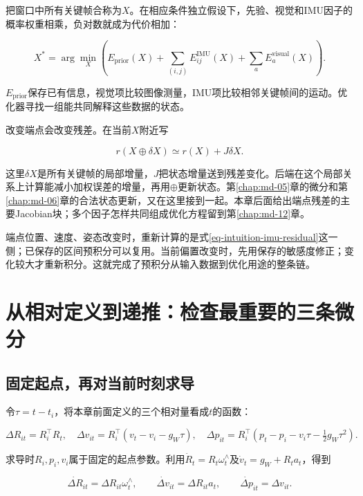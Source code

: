 把窗口中所有关键帧合称为$X$。在相应条件独立假设下，先验、视觉和IMU因子的概率权重相乘，负对数就成为代价相加：

\begin{equation*}
X^*=\arg\min_X\left(E_{\mathrm{prior}}(X)
       +\sum_{(i,j)}E_{ij}^{\mathrm{IMU}}(X)
       +\sum_a E_a^{\mathrm{visual}}(X)\right).
\end{equation*}

$E_{\mathrm{prior}}$保存已有信息，视觉项比较图像测量，IMU项比较相邻关键帧间的运动。优化器寻找一组能共同解释这些数据的状态。

改变端点会改变残差。在当前$X$附近写

\begin{equation*}
r(X\oplus\delta X)\simeq r(X)+J\delta X.
\end{equation*}

这里$\delta X$是所有关键帧的局部增量，$J$把状态增量送到残差变化。后端在这个局部关系上计算能减小加权误差的增量，再用$\oplus$更新状态。第\ref{chap:md-05}章的微分和第\ref{chap:md-06}章的合法状态更新，又在这里接到一起。本章后面给出端点残差的主要Jacobian块；多个因子怎样共同组成优化方程留到第\ref{chap:md-12}章。

端点位置、速度、姿态改变时，重新计算的是式\eqref{eq-intuition-imu-residual}这一侧；已保存的区间预积分可以复用。当前偏置改变时，先用保存的敏感度修正；变化较大才重新积分。这就完成了预积分从输入数据到优化用途的整条链。

\section{从相对定义到递推：检查最重要的三条微分}

\subsection{固定起点，再对当前时刻求导}

令$\tau=t-t_i$，将本章前面定义的三个相对量看成$t$的函数：

\begin{equation*}
\Delta R_{it}=R_i^\top R_t,\quad
\Delta v_{it}=R_i^\top(v_t-v_i-g_W\tau),\quad
\Delta p_{it}=R_i^\top(p_t-p_i-v_i\tau-\tfrac12g_W\tau^2).
\end{equation*}

求导时$R_i,p_i,v_i$属于固定的起点参数。利用$\dot R_t=R_t\omega_t^\wedge$及$\dot v_t=g_W+R_ta_t$，得到

\begin{equation*}
\dot{\Delta R}_{it}=\Delta R_{it}\omega_t^\wedge,\qquad
\dot{\Delta v}_{it}=\Delta R_{it}a_t,\qquad
\dot{\Delta p}_{it}=\Delta v_{it}.
\end{equation*}

